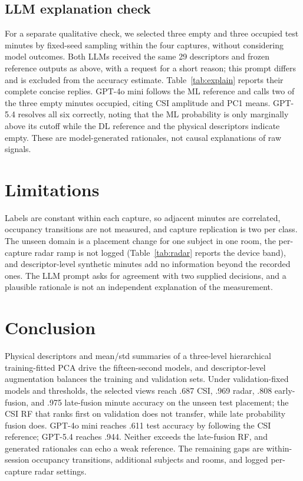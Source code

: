 \documentclass[conference,10pt,letterpaper]{IEEEtran}
\begin{document}
\subsection{LLM explanation check}
For a separate qualitative check, we selected three empty and three occupied test minutes by fixed-seed sampling within the four captures, without considering model outcomes. Both LLMs received the same 29 descriptors and frozen reference outputs as above, with a request for a short reason; this prompt differs and is excluded from the accuracy estimate. Table~\ref{tab:explain} reports their complete concise replies. GPT-4o mini follows the ML reference and calls two of the three empty minutes occupied, citing CSI amplitude and PC1 means. GPT-5.4 resolves all six correctly, noting that the ML probability is only marginally above its cutoff while the DL reference and the physical descriptors indicate empty. These are model-generated rationales, not causal explanations of raw signals.

\section{Limitations}\label{sec:limits}
Labels are constant within each capture, so adjacent minutes are correlated, occupancy transitions are not measured, and capture replication is two per class. The unseen domain is a placement change for one subject in one room, the per-capture radar ramp is not logged (Table~\ref{tab:radar} reports the device band), and descriptor-level synthetic minutes add no information beyond the recorded ones. The LLM prompt asks for agreement with two supplied decisions, and a plausible rationale is not an independent explanation of the measurement.

\section{Conclusion}\label{sec:conclusion}
Physical descriptors and mean/std summaries of a three-level hierarchical training-fitted PCA drive the fifteen-second models, and descriptor-level augmentation balances the training and validation sets. Under validation-fixed models and thresholds, the selected views reach .687 CSI, .969 radar, .808 early-fusion, and .975 late-fusion minute accuracy on the unseen test placement; the CSI RF that ranks first on validation does not transfer, while late probability fusion does. GPT-4o mini reaches .611 test accuracy by following the CSI reference; GPT-5.4 reaches .944. Neither exceeds the late-fusion RF, and generated rationales can echo a weak reference. The remaining gaps are within-session occupancy transitions, additional subjects and rooms, and logged per-capture radar settings.



\end{document}
